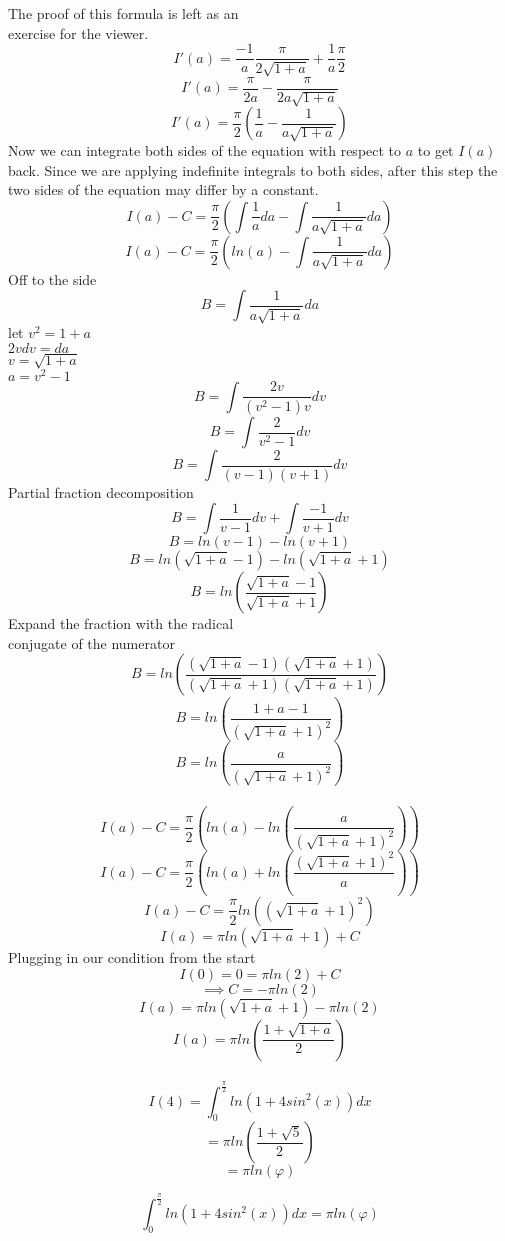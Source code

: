 \documentclass{article}
\begin{document}
{The proof of this formula is left as an
\\exercise for the viewer.
\[I'(a)=\frac{-1}{a}\frac{\pi}{2\sqrt{1+a}}+\frac{1}{a}\frac{\pi}{2}\]
\[I'(a)=\frac{\pi}{2a}-\frac{\pi}{2a\sqrt{1+a}}\]
\[I'(a)=\frac{\pi}{2}(\frac{1}{a}-\frac{1}{a\sqrt{1+a}})\]
Now we can integrate both sides of the equation with respect to $a$ to get $I(a)$ back. Since we are applying indefinite integrals to both sides, after this step the two sides of the equation may differ by a constant.
\[I(a)-C=\frac{\pi}{2}(\int\frac{1}{a}da-\int\frac{1}{a\sqrt{1+a}}da)\]
\[I(a)-C=\frac{\pi}{2}(ln(a)-\int\frac{1}{a\sqrt{1+a}}da)\]
Off to the side
\[B=\int\frac{1}{a\sqrt{1+a}}da\]
let $v^2=1+a$
\\$2vdv=da$
\\$v=\sqrt{1+a}$
\\$a=v^2-1$
\[B=\int\frac{2v}{(v^2-1)v}dv\]
\[B=\int\frac{2}{v^2-1}dv\]
\[B=\int\frac{2}{(v-1)(v+1)}dv\]
Partial fraction decomposition
\[B=\int\frac{1}{v-1}dv+\int\frac{-1}{v+1}dv\]
\[B=ln(v-1)-ln(v+1)\]
\[B=ln(\sqrt{1+a}-1)-ln(\sqrt{1+a}+1)\]
\[B=ln(\frac{\sqrt{1+a}-1}{\sqrt{1+a}+1})\]
Expand the fraction with the radical \\conjugate of the numerator
\[B=ln(\frac{(\sqrt{1+a}-1)(\sqrt{1+a}+1)}{(\sqrt{1+a}+1)(\sqrt{1+a}+1)})\]
\[B=ln(\frac{1+a-1}{(\sqrt{1+a}+1)^2})\]
\[B=ln(\frac{a}{(\sqrt{1+a}+1)^2})\]
\\
\[I(a)-C=\frac{\pi}{2}(ln(a)-ln(\frac{a}{(\sqrt{1+a}+1)^2}))\]
\[I(a)-C=\frac{\pi}{2}(ln(a)+ln(\frac{(\sqrt{1+a}+1)^2}{a}))\]
\[I(a)-C=\frac{\pi}{2}ln((\sqrt{1+a}+1)^2)\]
\[I(a)=\pi ln(\sqrt{1+a}+1)+C\]
Plugging in our condition from the start
\[I(0)=0=\pi ln(2)+C\]
\[\implies C=-\pi ln(2)\]
\[I(a)=\pi ln(\sqrt{1+a}+1)-\pi ln(2)\]
\[I(a)=\pi ln(\frac{1+\sqrt{1+a}}{2})\]\
\[I(4)=\int_{0}^{\frac{\pi}{2}}ln(1+4sin^2(x))dx\]
\[=\pi ln(\frac{1+\sqrt{5}}{2})\]
\[=\pi ln(\varphi)\]
}

\Huge{\[\int_{0}^{\frac{\pi}{2}}ln(1+4sin^2(x))dx=\pi ln(\varphi)\]}
\end{document}
